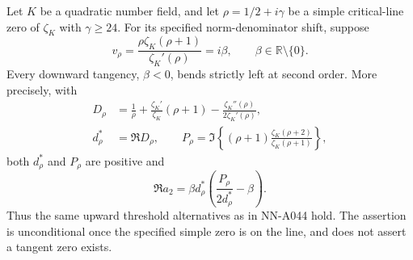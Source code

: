 \begin{corollary}
\label{cor:A044-quadratic}
Let \(K\) be a quadratic number field, and let
\(\rho=1/2+i\gamma\) be a simple critical-line zero of
\(\zeta_K\) with \(\gamma\ge24\). For its specified
norm-denominator shift, suppose
\[
                  v_\rho
       =\frac{\rho\zeta_K(\rho+1)}{\zeta_K'(\rho)}
       =i\beta,\qquad \beta\in\mathbb R\setminus\{0\}.
\]
Every downward tangency, \(\beta<0\), bends strictly left at
second order. More precisely, with
\[
 \begin{aligned}
 D_\rho&=\frac1\rho+\frac{\zeta_K'}{\zeta_K}(\rho+1)
                            -\frac{\zeta_K''(\rho)}{2\zeta_K'(\rho)},\\
 d_\rho^*&=\Re D_\rho,\qquad
 P_\rho=\Im\left\{(\rho+1)\frac{\zeta_K(\rho+2)}
                                      {\zeta_K(\rho+1)}\right\},
 \end{aligned}
\]
both \(d_\rho^*\) and \(P_\rho\) are positive and
\[
       \Re a_2=\beta d_\rho^*
                   \left(\frac{P_\rho}{2d_\rho^*}-\beta\right).
\]
Thus the same upward threshold alternatives as in NN-A044 hold.
The assertion is unconditional once the specified simple zero
is on the line, and does not assert a tangent zero exists.
\end{corollary}

